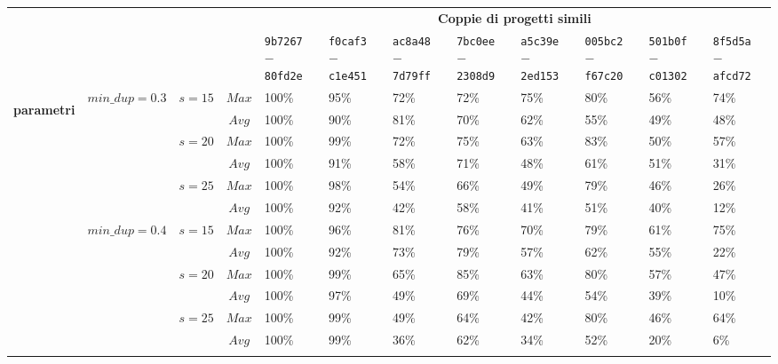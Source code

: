\begin{landscape}
    \begin{table}[h!]
        \centering
        \begin{tabular}{ p{0.5cm}|c|c|c||p{1.2cm}|p{1.2cm}|p{1.2cm}|p{1.2cm}|p{1.2cm}|p{1.2cm}|p{1.2cm}|p{1.2cm} }
            \multicolumn{4}{c}{} & \multicolumn{8}{c}{\textbf{Coppie di progetti simili}} \\ [1ex]
            \multicolumn{4}{c|}{} & \texttt{9b7267} $-$ \texttt{80fd2e} & \texttt{f0caf3} $-$ \texttt{c1e451} & \texttt{ac8a48} $-$ \texttt{7d79ff} & \texttt{7bc0ee} $-$ \texttt{2308d9} & \texttt{a5c39e} $-$ \texttt{2ed153} & \texttt{005bc2} $-$ \texttt{f67c20} & \texttt{501b0f} $-$ \texttt{c01302} & \texttt{8f5d5a} $-$ \texttt{afcd72} \\ [1ex]
            \hline\hline

            \multirow{18}{*}{\begin{turn}{90}\textbf{parametri}\end{turn}} & \multirow{6}{*}{$min\_dup=0.3$} & \multirow{2}{*}{$s=15$} & $Max$ & 100\% & 95\% & 72\% & 72\% & 75\% & 80\% & 56\% & 74\% \\
            & & & $Avg$ & 100\% & 90\% & 81\% & 70\% & 62\% & 55\% & 49\% & 48\% \\
            & & \multirow{2}{*}{$s=20$} & $Max$ & 100\% & 99\% & 72\% & 75\% & 63\% & 83\% & 50\% & 57\% \\
            & & & $Avg$ & 100\% & 91\% & 58\% & 71\% & 48\% & 61\% & 51\% & 31\% \\
            & & \multirow{2}{*}{$s=25$} & $Max$ & 100\% & 98\% & 54\% & 66\% & 49\% & 79\% & 46\% & 26\% \\
            & & & $Avg$ & 100\% & 92\% & 42\% & 58\% & 41\% & 51\% & 40\% & 12\% \\
            \cline{2-12}

            & \multirow{6}{*}{$min\_dup=0.4$} & \multirow{2}{*}{$s=15$} & $Max$ & 100\% & 96\% & 81\% & 76\% & 70\% & 79\% & 61\% & 75\% \\
            & & & $Avg$ & 100\% & 92\% & 73\% & 79\% & 57\% & 62\% & 55\% & 22\% \\
            & & \multirow{2}{*}{$s=20$} & $Max$ & 100\% & 99\% & 65\% & 85\% & 63\% & 80\% & 57\% & 47\% \\
            & & & $Avg$ & 100\% & 97\% & 49\% & 69\% & 44\% & 54\% & 39\% & 10\% \\
            & & \multirow{2}{*}{$s=25$} & $Max$ & 100\% & 99\% & 49\% & 64\% & 42\% & 80\% & 46\% & 64\% \\
            & & & $Avg$ & 100\% & 99\% & 36\% & 62\% & 34\% & 52\% & 20\% & 6\% \\
            \cline{2-12}


\end{tabular}
\end{table}
\end{landscape}
